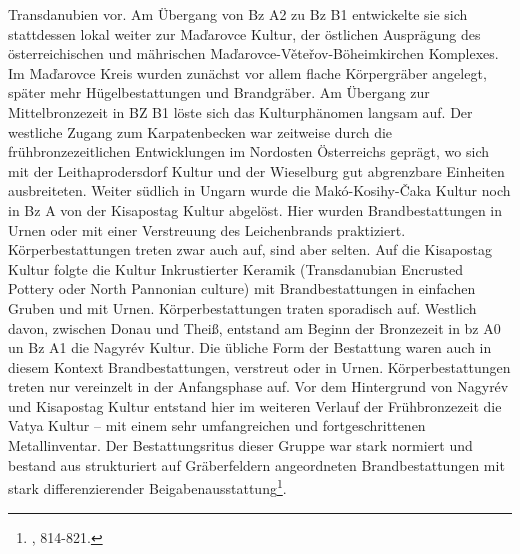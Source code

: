 \documentclass[openany,twoside,twocolumn]{book}
\let\rmarkdownfootnote\footnote%
\def\footnote{\protect\rmarkdownfootnote}
\begin{document}
Transdanubien vor. Am Übergang von Bz A2 zu Bz B1 entwickelte sie sich
stattdessen lokal weiter zur Maďarovce Kultur, der östlichen Ausprägung
des österreichischen und mährischen Maďarovce-Věteřov-Böheimkirchen
Komplexes. Im Maďarovce Kreis wurden zunächst vor allem flache
Körpergräber angelegt, später mehr Hügelbestattungen und Brandgräber. Am
Übergang zur Mittelbronzezeit in BZ B1 löste sich das Kulturphänomen
langsam auf. Der westliche Zugang zum Karpatenbecken war zeitweise durch
die frühbronzezeitlichen Entwicklungen im Nordosten Österreichs geprägt,
wo sich mit der Leithaprodersdorf Kultur und der Wieselburg gut
abgrenzbare Einheiten ausbreiteten. Weiter südlich in Ungarn wurde die
Makó-Kosihy-Čaka Kultur noch in Bz A von der Kisapostag Kultur abgelöst.
Hier wurden Brandbestattungen in Urnen oder mit einer Verstreuung des
Leichenbrands praktiziert. Körperbestattungen treten zwar auch auf, sind
aber selten. Auf die Kisapostag Kultur folgte die Kultur Inkrustierter
Keramik (Transdanubian Encrusted Pottery oder North Pannonian culture)
mit Brandbestattungen in einfachen Gruben und mit Urnen.
Körperbestattungen traten sporadisch auf. Westlich davon, zwischen Donau
und Theiß, entstand am Beginn der Bronzezeit in bz A0 un Bz A1 die
Nagyrév Kultur. Die übliche Form der Bestattung waren auch in diesem
Kontext Brandbestattungen, verstreut oder in Urnen. Körperbestattungen
treten nur vereinzelt in der Anfangsphase auf. Vor dem Hintergrund von
Nagyrév und Kisapostag Kultur entstand hier im weiteren Verlauf der
Frühbronzezeit die Vatya Kultur -- mit einem sehr umfangreichen und
fortgeschrittenen Metallinventar. Der Bestattungsritus dieser Gruppe war
stark normiert und bestand aus strukturiert auf Gräberfeldern
angeordneten Brandbestattungen mit stark differenzierender
Beigabenausstattung\footnote{\textcite{markova_slovakia_2013}, 814-821.}.
\end{document}
